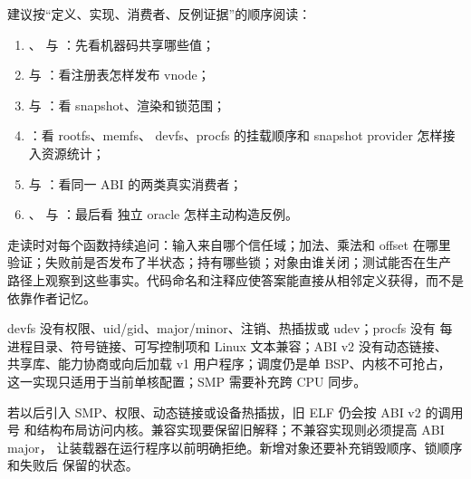 建议按“定义、实现、消费者、反例证据”的顺序阅读：

\begin{enumerate}[leftmargin=2.1em]
  \item {}、
         与 ：先看机器码共享哪些值；
  \item {} 与
        ：看注册表怎样发布 vnode；
  \item {} 与
        ：看 snapshot、渲染和锁范围；
  \item {}：看 rootfs、memfs、
        devfs、procfs 的挂载顺序和 snapshot provider 怎样接入资源统计；
  \item {} 与
        ：看同一 ABI 的两类真实消费者；
  \item {}、
         与
        ：最后看
        独立 oracle 怎样主动构造反例。
\end{enumerate}

走读时对每个函数持续追问：输入来自哪个信任域；加法、乘法和 offset 在哪里
验证；失败前是否发布了半状态；持有哪些锁；对象由谁关闭；测试能否在生产
路径上观察到这些事实。代码命名和注释应使答案能直接从相邻定义获得，而不是
依靠作者记忆。

devfs 没有权限、uid/gid、major/minor、注销、热插拔或 udev；procfs 没有
每进程目录、符号链接、可写控制项和 Linux 文本兼容；ABI v2 没有动态链接、
共享库、能力协商或向后加载 v1 用户程序；调度仍是单 BSP、内核不可抢占，
这一实现只适用于当前单核配置；SMP 需要补充跨 CPU 同步。

若以后引入 SMP、权限、动态链接或设备热插拔，旧 ELF 仍会按 ABI v2 的调用号
和结构布局访问内核。兼容实现要保留旧解释；不兼容实现则必须提高 ABI major，
让装载器在运行程序以前明确拒绝。新增对象还要补充销毁顺序、锁顺序和失败后
保留的状态。
